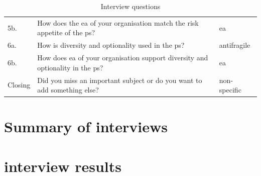 \begin{table}[!h]
\begin{center}
\begin{tabular}{@{}p{}p{}p{}@{}}
				5b. & How does the \acrshort{ea} of your organisation match the risk appetite of the \gls{ps}?
				  & \acrshort{ea} \\%
				6a. & How is \gls{diversity} and \gls{optionality} used in the \gls{ps}? & \Gls{antifragile} \\%
				6b. & How does \acrshort{ea} of your organisation support \gls{diversity} and \gls{optionality} in the \gls{ps}? & \acrshort{ea} \\%
				Closing & Did you miss an important subject or do you want to add something else? & non-specific \\%
				\bottomrule
			\end{tabular}
		\caption{Interview questions}
	\end{center}
\end{table}

\section{Summary of interviews}

\section{interview results}
